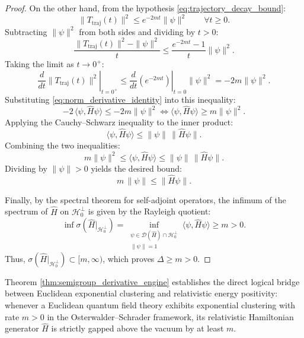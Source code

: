 \begin{proof}
On the other hand, from the hypothesis \eqref{eq:trajectory_decay_bound}:
\begin{equation}
\|T_{\mathrm{traj}}(t)\|^2 \le e^{-2 m t} \|\psi\|^2 \qquad \forall t \ge 0.
\end{equation}
Subtracting $\|\psi\|^2$ from both sides and dividing by $t > 0$:
\begin{equation}
\frac{\|T_{\mathrm{traj}}(t)\|^2 - \|\psi\|^2}{t} \le \frac{e^{-2 m t} - 1}{t} \|\psi\|^2.
\end{equation}
Taking the limit as $t \to 0^+$:
\begin{equation}
\left. \frac{d}{dt} \|T_{\mathrm{traj}}(t)\|^2 \right|_{t=0^+} \le \left. \frac{d}{dt} \left( e^{-2 m t} \right) \right|_{t=0} \|\psi\|^2 = -2 m \|\psi\|^2.
\end{equation}
Substituting \eqref{eq:norm_derivative_identity} into this inequality:
\begin{equation}
-2 \, \langle \psi, \hat{H} \psi \rangle \le -2 m \|\psi\|^2 \iff \langle \psi, \hat{H} \psi \rangle \ge m \|\psi\|^2.
\end{equation}
Applying the Cauchy--Schwarz inequality to the inner product:
\begin{equation}
\langle \psi, \hat{H} \psi \rangle \le \|\psi\| \, \|\hat{H} \psi\|.
\end{equation}
Combining the two inequalities:
\begin{equation}
m \|\psi\|^2 \le \langle \psi, \hat{H} \psi \rangle \le \|\psi\| \, \|\hat{H} \psi\|.
\end{equation}
Dividing by $\|\psi\| > 0$ yields the desired bound:
\begin{equation}
m \, \|\psi\| \le \|\hat{H} \psi\|.
\end{equation}

Finally, by the spectral theorem for self-adjoint operators, the infimum of the spectrum of $\hat{H}$ on $\mathcal{H}_0^\perp$ is given by the Rayleigh quotient:
\begin{equation}
\inf \sigma(\hat{H}|_{\mathcal{H}_0^\perp}) = \inf_{\substack{\psi \in \mathcal{D}(\hat{H}) \cap \mathcal{H}_0^\perp \\ \|\psi\| = 1}} \langle \psi, \hat{H} \psi \rangle \ge m > 0.
\end{equation}
Thus, $\sigma(\hat{H}|_{\mathcal{H}_0^\perp}) \subset [m, \infty)$, which proves $\Delta \ge m > 0$.
\end{proof}

Theorem \ref{thm:semigroup_derivative_engine} establishes the direct logical bridge between Euclidean exponential clustering and relativistic energy positivity: whenever a Euclidean quantum field theory exhibits exponential clustering with rate $m > 0$ in the Osterwalder--Schrader framework, its relativistic Hamiltonian generator $\hat{H}$ is strictly gapped above the vacuum by at least $m$.

